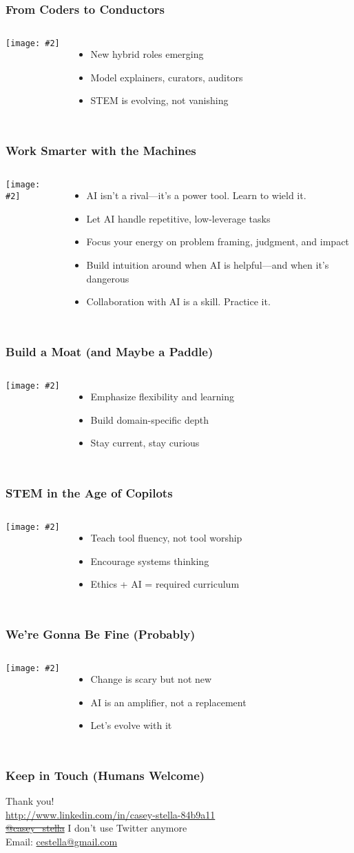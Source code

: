 \documentclass{beamer}
\newcommand{\slidewithimage}[3]{%
  \begin{frame}
    \frametitle{#1}
    \begin{columns}
      \column{0.5\textwidth}
        \texttt{[image: \#2]}\\[1em]
      \column{0.5\textwidth}
        #3
    \end{columns}
  \end{frame}
}
\begin{document}
\slidewithimage{From Coders to Conductors}{roles-image.png}{
  \begin{itemize}
    \item New hybrid roles emerging
    \item Model explainers, curators, auditors
    \item STEM is evolving, not vanishing
  \end{itemize}
}

\slidewithimage{Work Smarter with the Machines}{coexist-image.png}{
  \begin{itemize}
    \item AI isn't a rival—it's a power tool. Learn to wield it.
    \item Let AI handle repetitive, low-leverage tasks
    \item Focus your energy on problem framing, judgment, and impact
    \item Build intuition around when AI is helpful—and when it’s dangerous
    \item Collaboration with AI is a skill. Practice it.
  \end{itemize}
}

\slidewithimage{Build a Moat (and Maybe a Paddle)}{career-image.png}{
  \begin{itemize}
    \item Emphasize flexibility and learning
    \item Build domain-specific depth
    \item Stay current, stay curious
  \end{itemize}
}

\slidewithimage{STEM in the Age of Copilots}{education-image.png}{
  \begin{itemize}
    \item Teach tool fluency, not tool worship
    \item Encourage systems thinking
    \item Ethics + AI = required curriculum
  \end{itemize}
}

\slidewithimage{We’re Gonna Be Fine (Probably)}{wrap-image.png}{
  \begin{itemize}
    \item Change is scary but not new
    \item AI is an amplifier, not a replacement
    \item Let’s evolve with it
  \end{itemize}
}

\begin{frame}
  \frametitle{Keep in Touch (Humans Welcome)}
  \begin{center}
    \Large Thank you! \\
    \vspace{1em}
    \href{http://www.linkedin.com/in/casey-stella-84b9a11}{http://www.linkedin.com/in/casey-stella-84b9a11} \\
    \sout{\href{https://twitter.com/casey_stella}{@casey\_stella}} I don't use Twitter anymore \\
    Email: \href{mailto:cestella@gmail.com}{cestella@gmail.com}
  \end{center}
\end{frame}
\end{document}
